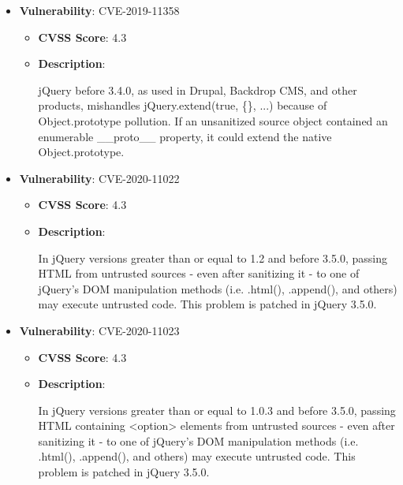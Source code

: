 \documentclass{article}
\begin{document}
\begin{itemize}
    
        \item \textbf{Vulnerability}: CVE-2019-11358
        \begin{itemize}
            \item \textbf{CVSS Score}:  4.3 
            \item \textbf{Description}:
            \parbox[t]{0.9\linewidth}{
                \ttfamily jQuery before 3.4.0, as used in Drupal, Backdrop CMS, and other products, mishandles jQuery.extend(true, \{\}, ...) because of Object.prototype pollution. If an unsanitized source object contained an enumerable \_\_proto\_\_ property, it could extend the native Object.prototype.
            }
        \end{itemize}
    
        \item \textbf{Vulnerability}: CVE-2020-11022
        \begin{itemize}
            \item \textbf{CVSS Score}:  4.3 
            \item \textbf{Description}:
            \parbox[t]{0.9\linewidth}{
                \ttfamily In jQuery versions greater than or equal to 1.2 and before 3.5.0, passing HTML from untrusted sources - even after sanitizing it - to one of jQuery's DOM manipulation methods (i.e. .html(), .append(), and others) may execute untrusted code. This problem is patched in jQuery 3.5.0.
            }
        \end{itemize}
    
        \item \textbf{Vulnerability}: CVE-2020-11023
        \begin{itemize}
            \item \textbf{CVSS Score}:  4.3 
            \item \textbf{Description}:
            \parbox[t]{0.9\linewidth}{
                \ttfamily In jQuery versions greater than or equal to 1.0.3 and before 3.5.0, passing HTML containing <option> elements from untrusted sources - even after sanitizing it - to one of jQuery's DOM manipulation methods (i.e. .html(), .append(), and others) may execute untrusted code. This problem is patched in jQuery 3.5.0.
            }
        \end{itemize}
    
\end{itemize}
\end{document}
